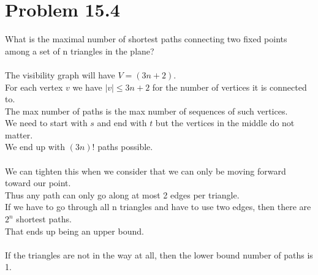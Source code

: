 \documentclass[11pt,psfig]{article}
\begin{document}
\section*{Problem 15.4}

What is the maximal number of shortest paths connecting two ﬁxed
points among a set of n triangles in the plane?\\
\\
The visibility graph will have $V = (3n+2)$.\\
For each vertex $v$ we have $|v| \leq 3n + 2$ for the number of vertices it is connected to. \\
The max number of paths is the max number of sequences of such vertices. \\
We need to start with $s$ and end with $t$ but the vertices in the middle do not matter. \\
We end up with $(3n)!$ paths possible. \\
\\
We can tighten this when we consider that we can only be moving forward toward our point. \\
Thus any path can only go along at most 2 edges per triangle. \\
If we have to go through all n triangles and have to use two edges, then there are $2^n$ shortest paths. \\
That ends up being an upper bound. \\
\\
If the triangles are not in the way at all, then the lower bound number of paths is 1. \\
\\
\end{document}
